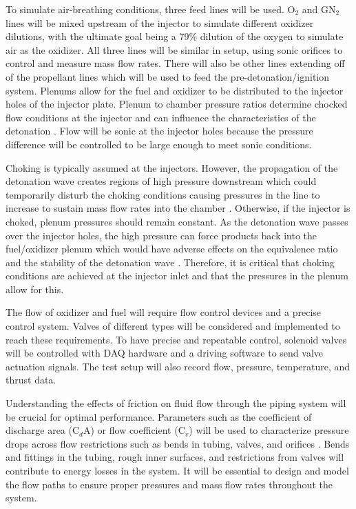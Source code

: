 To simulate air-breathing conditions, three feed lines will be used. O$_2$ and GN$_2$ lines will be mixed upstream of the injector to simulate different oxidizer dilutions, with the ultimate goal being a 79\% dilution of the oxygen to simulate air as the oxidizer. All three lines will be similar in setup, using sonic orifices to control and measure mass flow rates. There will also be other lines extending off of the propellant lines which will be used to feed the pre-detonation/ignition system. Plenums allow for the fuel and oxidizer to be distributed to the injector holes of the injector plate. Plenum to chamber pressure ratios determine chocked flow conditions at the injector and can influence the characteristics of the detonation \cite{fiorino:2022, yokoo:2019}. Flow will be sonic at the injector holes because the pressure difference will be controlled to be large enough to meet sonic conditions.

Choking is typically assumed at the injectors. However, the propagation of the detonation wave creates regions of high pressure downstream which could temporarily disturb the choking conditions causing pressures in the line to increase to sustain mass flow rates into the chamber \cite{yokoo:2019}. Otherwise, if the injector is choked, plenum pressures should remain constant. As the detonation wave passes over the injector holes, the high pressure can force products back into the fuel/oxidizer plenum which would have adverse effects on the equivalence ratio and the stability of the detonation wave \cite{dechert:2020}. Therefore, it is critical that choking conditions are achieved at the injector inlet and that the pressures in the plenum allow for this.

The flow of oxidizer and fuel will require flow control devices and a precise control system. Valves of different types will be considered and implemented to reach these requirements. To have precise and repeatable control, solenoid valves will be controlled with DAQ hardware and a driving software to send valve actuation signals. The test setup will also record flow, pressure, temperature, and thrust data.

Understanding the effects of friction on fluid flow through the piping system will be crucial for optimal performance. Parameters such as the coefficient of discharge area (C$_d$A) or flow coefficient (C$_v$) will be used to characterize pressure drops across flow restrictions such as bends in tubing, valves, and orifices \cite{crane-co:1982, asme-fluid-flow:2004, nasa-tubing:2019}. Bends and fittings in the tubing, rough inner surfaces, and restrictions from valves will contribute to energy losses in the system. It will be essential to design and model the flow paths to ensure proper pressures and mass flow rates throughout the system.

